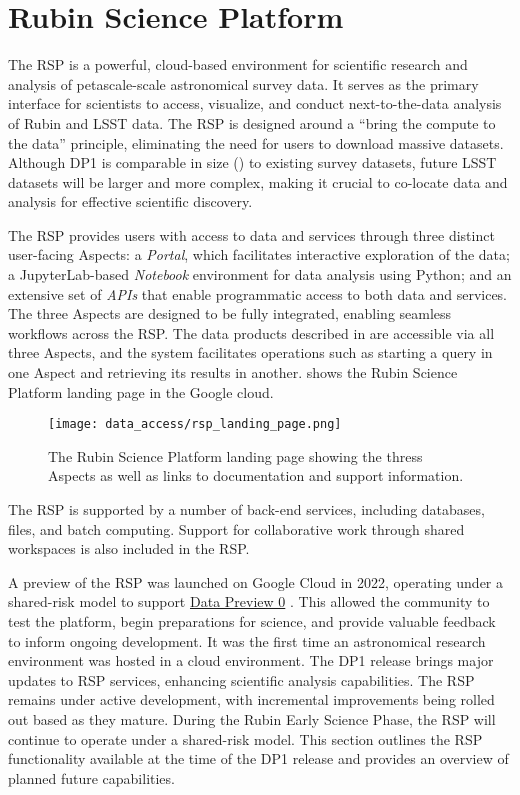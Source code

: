 \section{Rubin Science Platform}
\label{sec:data_services}

The \gls{RSP} \citep{LSE-319} is a powerful, cloud-based environment for scientific research and analysis of petascale-scale astronomical survey data. 
It serves as the primary interface for scientists to access, visualize, and conduct next-to-the-data analysis of Rubin and \gls{LSST} data. 
The  RSP is designed around a  ``bring the compute to the data'' principle, eliminating the need for users to download massive datasets. 
Although \gls{DP1} is comparable in size (\sizeinbytes) to existing survey datasets, future LSST datasets will be larger and more complex, making it crucial to co-locate data and analysis for effective scientific discovery.

The \gls{RSP} provides users with access to data and services through three distinct user-facing Aspects: a \emph{Portal}, which facilitates interactive exploration of the data; a JupyterLab-based \emph{Notebook} environment for data analysis using Python; and an extensive set of \emph{\glspl{API}} that enable programmatic access to both data and services.
The three Aspects are designed to be fully integrated, enabling seamless workflows across the \gls{RSP}.
The data products described in  are accessible via all three Aspects, and the system facilitates operations such as starting a query in one Aspect and retrieving its results in another.
 shows the Rubin Science Platform landing page in the Google cloud.
\begin{figure}[htb!]
\centering
\texttt{[image: data\_access/rsp\_landing\_page.png]}
\caption{The Rubin Science Platform landing page showing the thress Aspects as well as links to documentation and support information.}
\label{fig:rsp_landing_page}
\vspace{0.1cm}
\end{figure}

The \gls{RSP} is supported by a number of back-end services, including databases, files, and batch computing. 
Support for collaborative work through shared workspaces is also included in the RSP.

A preview of the \gls{RSP} was launched on Google Cloud in 2022, operating under a shared-risk model to support \href{https://dp0.lsst.io/}{Data Preview 0} \citep{2024ASPC..535..227O}. This allowed the community to test the platform, begin preparations  for science, and provide valuable feedback to inform ongoing development. 
It was the first time an astronomical research environment was hosted in a cloud environment.
The DP1 release brings major updates to RSP services, enhancing scientific analysis capabilities. 
The RSP remains under active development, with incremental improvements being rolled out based as they mature.
During the Rubin Early Science Phase, the RSP will continue to operate under a shared-risk model.
This section outlines the RSP functionality available at the time of the DP1 release and provides an overview of planned future capabilities.

